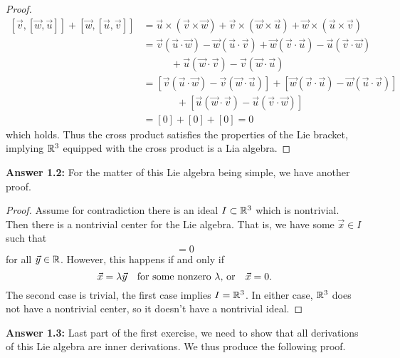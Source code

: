 \begin{proof}
\begin{subequations}
\begin{align}
\left[\vec{v},[\vec{w},\vec{u}]\right] +
\left[\vec{w},[\vec{u},\vec{v}]\right] &= \vec{u}\times(\vec{v}\times\vec{w})+\vec{v}\times(\vec{w}\times\vec{u})+\vec{w}\times(\vec{u}\times\vec{v})\\
&=\vec{v}(\vec{u}\cdot\vec{w})-\vec{w}(\vec{u}\cdot\vec{v})+\vec{w}(\vec{v}\cdot\vec{u})-\vec{u}(\vec{v}\cdot\vec{w})\nonumber\\
&\phantom{=+\vec{v}}+\vec{u}(\vec{w}\cdot\vec{v})-\vec{v}(\vec{w}\cdot\vec{u})\\
&=\left[\vec{v}(\vec{u}\cdot\vec{w})-\vec{v}(\vec{w}\cdot\vec{u})\right]+\left[\vec{w}(\vec{v}\cdot\vec{u})-\vec{w}(\vec{u}\cdot\vec{v})\right]\nonumber\\
&\phantom{=\left[\vec{w}\right]}+\left[\vec{u}(\vec{w}\cdot\vec{v})-\vec{u}(\vec{v}\cdot\vec{w})\right]\\
&=[0]+[0]+[0]=0
\end{align}
\end{subequations}
which holds. Thus the cross product satisfies the properties of
the Lie bracket, implying $\Bbb{R}^{3}$ equipped with the cross
product is a Lia algebra.
\end{proof}

\medbreak\noindent\textbf{Answer 1.2:\enspace}
For the matter of this Lie algebra being simple, we have another
proof.

\begin{proof}
Assume for contradiction there is an ideal
$I\subset\Bbb{R}^{3}$ which is nontrivial. Then there is a
nontrivial center for the Lie algebra. That is, we have some
$\vec{x}\in I$ such that
\begin{equation}
[\vec{x},\vec{y}]=0
\end{equation}
for all $\vec{y}\in\Bbb{R}$. However, this happens if and only if
\begin{equation}
\vec{x}=\lambda\vec{y}\quad\hbox{for some nonzero $\lambda$, or}\quad\vec{x}=0.
\end{equation}
The second case is trivial, the first case implies
$I=\Bbb{R}^{3}$. In either case, $\Bbb{R}^{3}$ does not have a
nontrivial center, so it doesn't have a nontrivial ideal.
\end{proof}

\medbreak\noindent\textbf{Answer 1.3:\enspace}
Last part of the first exercise, we need to show that all
derivations of this Lie algebra are inner derivations. We thus
produce the following proof.

